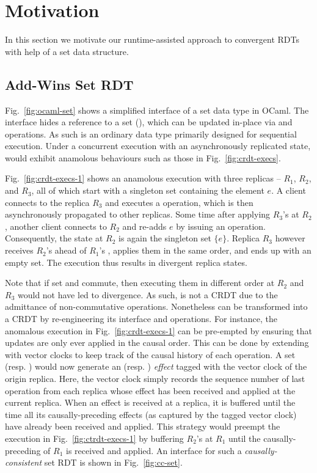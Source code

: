 \section{Motivation}
\label{sec:motivation}

In this section we motivate our runtime-assisted approach to
convergent RDTs with help of a set data structure.

\subsection{Add-Wins Set RDT}

Fig.~\ref{fig:ocaml-set} shows a simplified interface of a set data
type in OCaml. The interface hides a reference to a set (),
which can be updated in-place via  and 
operations. As such  is an ordinary data type primarily
designed for sequential execution. Under a concurrent execution with
an asynchronously replicated state,  would exhibit anamolous
behaviours such as those in Fig.~\ref{fig:crdt-execs}.

Fig.~\ref{fig:crdt-execs-1} shows an anamolous execution with three
replicas -- $R_1$, $R_2$, and $R_3$, all of which start with a
singleton set containing the element $e$. A client connects to the
replica $R_3$ and executes a  operation, which is then
asynchronously propagated to other replicas. Some time after applying
$R_3$'s  at $R_2$, another client connects to $R_2$ and
re-adds $e$ by issuing an  operation. Consequently, the
state at $R_2$ is again the singleton set $\{e\}$. Replica $R_3$
however receives $R_2$'s  ahead of $R_1$'s ,
applies them in the same order, and ends up with an empty set. The
execution thus results in divergent replica states.

Note that if set  and  commute, then executing
them in different order at $R_2$ and $R_3$ would not have led to
divergence. As such,  is not a CRDT due to the admittance of
non-commutative operations. Nonetheless  can be transformed
into a CRDT by re-engineering its interface and operations. For
instance, the anomalous execution in Fig.~\ref{fig:crdt-execs-1} can
be pre-empted by ensuring that updates are only ever applied in the
causal order.  This can be done by extending  with vector
clocks to keep track of the causal history of each operation. A set
 (resp. ) would now generate an  (resp.
) \emph{effect} tagged with the vector clock of the origin
replica. Here, the vector clock simply records the sequence number of
last operation from each replica whose effect has been received and
applied at the current replica. When an effect is received at a
replica, it is buffered until the time all its causally-preceding
effects (as captured by the tagged vector clock) have already been
received and applied. This strategy would preempt the execution in
Fig.~\ref{fig:ctrdt-execs-1} by buffering $R_2$'s  at $R_1$
until the causally-preceding  of $R_1$ is received and
applied. An interface for such a \emph{causally-consistent} set RDT is
shown in Fig.~\ref{fig:cc-set}. 

